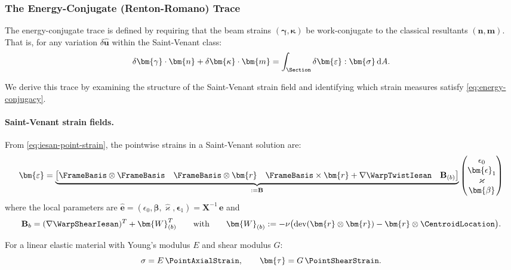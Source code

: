 \subsubsection{The Energy-Conjugate (Renton-Romano) Trace}

The energy-conjugate trace is defined by requiring that the beam strains 
$(\bm{\gamma}, \bm{\kappa})$ be work-conjugate to the classical resultants 
$(\bm{n}, \bm{m})$. 
That is, for any variation $\delta\hat{\bm{u}}$ within the 
Saint-Venant class:
\begin{equation}
\delta\bm{\gamma} \cdot \bm{n} + \delta\bm{\kappa} \cdot \bm{m} 
= \int_\Section \delta\bm{\varepsilon} : \bm{\sigma} \, \mathrm{d}A.
\label{eq:energy-conjugacy}
\end{equation}

We derive this trace by examining the structure of the Saint-Venant strain 
field and identifying which strain measures satisfy \eqref{eq:energy-conjugacy}.

\paragraph{Saint-Venant strain fields.}

From \eqref{eq:iesan-point-strain}, the pointwise strains in a Saint-Venant 
solution are:
\begin{equation}
    \bm{\varepsilon} = \underbrace{\begin{bmatrix}
        \FrameBasis\otimes\FrameBasis & \FrameBasis\otimes\bm{r} & \FrameBasis\times\bm{r} + \nabla\WarpTwistIesan
        & \mathbf{B}_{(b)}
    \end{bmatrix}}_{:=\mathbf{B}}
    \begin{pmatrix}
        \epsilon_0 \\ \bm{\epsilon}_1\\ \varkappa \\ \bm{\beta}
    \end{pmatrix}
\label{eq:sv-shear-strain}
\end{equation}
where the local parameters are 
$\hat{\bm{e}} = (\epsilon_0, \bm{\beta}, \hat{\varkappa}, \bm{\epsilon}_1) = \mathbf{X}^{-1}\,\bm{e}$ and 
\begin{equation*}
\mathbf{B}_{b} = (\nabla\WarpShearIesan)^T + \bm{W}_{(b)}^T
\qquad\text{with}\qquad
\bm{W}_{(b)} := -\nu\big(\mathrm{dev}(\bm{r} \otimes \bm{r}) 
- \bm{r} \otimes \CentroidLocation\big).
\end{equation*}

For a linear elastic material with Young's modulus $E$ and shear modulus $G$:
\begin{equation*}
\sigma = E\,\PointAxialStrain, \qquad \bm{\tau} = G\,\PointShearStrain.
\end{equation*}

